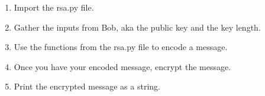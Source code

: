 \documentclass{article}
\begin{document}
    \begin{enumerate}
        \item Import the rsa.py file.

            \TextField[width=6in,height=1in]{}

        \item Gather the inputs from Bob, aka the public key and the key length.
            
            \TextField[width=6in,height=1in]{}

        \item Use the functions from the rsa.py file to encode a message.

        \TextField[width=6in,height=1in]{}

        \item Once you have your encoded message, encrypt the message.

        \TextField[width=6in,height=1in]{}

        \item Print the encrypted message as a string.

        \TextField[width=6in,height=1in]{}

    \end{enumerate}
\end{document}
